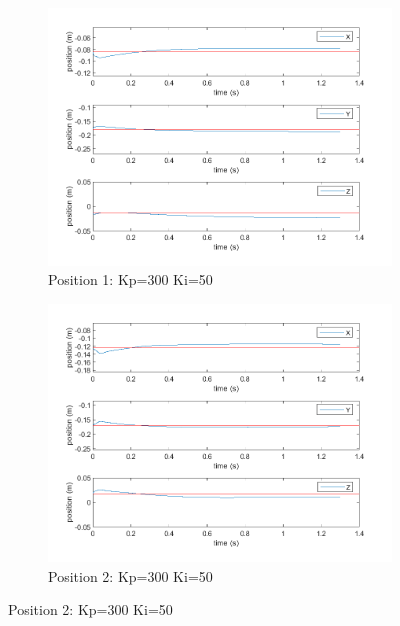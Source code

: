 \begin{figure}[ht]
    \begin{subfigure}[b]{0.45\textwidth}
        \includegraphics[width=\linewidth]{Pictures/Controller/Kp300Ki50/1.png}
        \caption{Position 1: Kp=300 Ki=50}
    \end{subfigure}%
    \hfill
    \begin{subfigure}[b]{0.45\textwidth}
        \includegraphics[width=\linewidth]{Pictures/Controller/Kp300Ki50/17.png}
        \caption{Position 2: Kp=300 Ki=50}
    \end{subfigure}

    \vspace{2pt} %


\end{figure}
